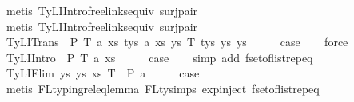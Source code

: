 \begin{isabellebody}
\ {\isacharparenleft}{\kern0pt}metis\ TyLIIntro{\isacharunderscore}{\kern0pt}freelinks{\isacharunderscore}{\kern0pt}equiv\ surj{\isacharunderscore}{\kern0pt}pair{\isacharparenright}{\kern0pt}\isanewline
\ \ \isamarkupfalse%
\ {\isacharparenleft}{\kern0pt}metis\ TyLIIntro{\isacharunderscore}{\kern0pt}freelinks{\isacharunderscore}{\kern0pt}equiv\ surj{\isacharunderscore}{\kern0pt}pair{\isacharparenright}{\kern0pt}\isanewline
\ \ \isamarkupfalse%
\isanewline
{}\isamarkupfalse%
\isanewline
\ \ \isamarkupfalse%
\ {\isacharparenleft}{\kern0pt}TyLITrans\ {\isasymGamma}\ P\ T{}\ a{}\ xs{}\ tys{}\ a{}\ xs{}\ ys{}\ T{}\ tys{}\ ys{}\ ys{\isacharparenright}{\kern0pt}\isanewline
\ \ \isamarkupfalse%
\ \isamarkupfalse%
\ {\isacharquery}{\kern0pt}case\isanewline
\ \ \isamarkupfalse%
\ force\isanewline
{}\isamarkupfalse%
\isanewline
\ \ \isamarkupfalse%
\ {\isacharparenleft}{\kern0pt}TyLIIntro{}\ {\isasymGamma}\ P\ T\ a\ xs{\isacharparenright}{\kern0pt}\isanewline
\ \ \isamarkupfalse%
\ \isamarkupfalse%
\ {\isacharquery}{\kern0pt}case\isanewline
\ \ \isamarkupfalse%
\ {\isacharparenleft}{\kern0pt}simp\ add{\isacharcolon}{\kern0pt}\ fset{\isacharunderscore}{\kern0pt}of{\isacharunderscore}{\kern0pt}list{\isachardot}{\kern0pt}rep{\isacharunderscore}{\kern0pt}eq{\isacharparenright}{\kern0pt}\isanewline
{}\isamarkupfalse%
\isanewline
\ \ \isamarkupfalse%
\ {\isacharparenleft}{\kern0pt}TyLIElim{}\ ys\ ys{\isacharprime}{\kern0pt}\ xs\ T\ {\isasymGamma}\ P\ a{\isacharparenright}{\kern0pt}\isanewline
\ \ \isamarkupfalse%
\ \isamarkupfalse%
\ {\isacharquery}{\kern0pt}case\isanewline
\ \ \isamarkupfalse%
\ {\isacharparenleft}{\kern0pt}metis\ FL{\isacharunderscore}{\kern0pt}typing{\isacharunderscore}{\kern0pt}rel{\isacharunderscore}{\kern0pt}eq{\isacharunderscore}{\kern0pt}lemma{}\ FLty{\isachardot}{\kern0pt}simps{\isacharparenleft}{\kern0pt}{}{\isacharcomma}{\kern0pt}{}{\isacharparenright}{\kern0pt}\ exp{\isachardot}{\kern0pt}inject{\isacharparenleft}{\kern0pt}{}{\isacharparenright}{\kern0pt}\ fset{\isacharunderscore}{\kern0pt}of{\isacharunderscore}{\kern0pt}list{\isachardot}{\kern0pt}rep{\isacharunderscore}{\kern0pt}eq{\isacharparenright}{\kern0pt}\isanewline

\end{isabellebody}
